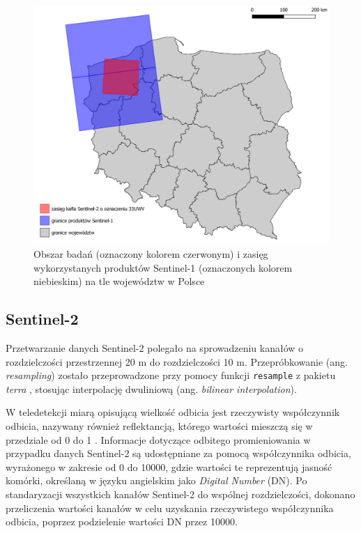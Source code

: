 \documentclass{amuthesis}
\begin{document}
\begin{figure}[t]

{\centering \includegraphics[width=1\textwidth,height=\textheight]{figures/sen1_extents.png}

}

\caption{\label{fig-rycina-s1-extents}Obszar badań (oznaczony kolorem
czerwonym) i zasięg wykorzystanych produktów Sentinel-1 (oznaczonych
kolorem niebieskim) na tle województw w Polsce}

\end{figure}

\hypertarget{sec-processing-s2}{%
\subsection{Sentinel-2}\label{sec-processing-s2}}

Przetwarzanie danych Sentinel-2 polegało na sprowadzeniu kanałów o
rozdzielczości przestrzennej 20 m do rozdzielczości 10 m.
Przepróbkowanie (ang. \emph{resampling}) zostało przeprowadzone przy
pomocy funkcji \texttt{resample} z pakietu \emph{terra}
\autocite{R-terra}, stosując interpolację dwuliniową (ang.
\emph{bilinear interpolation}).

W teledetekcji miarą opisującą wielkość odbicia jest rzeczywisty
współczynnik odbicia, nazywany również reflektancją, którego wartości
mieszczą się w przedziale od 0 do 1 \autocite{hejmanowska_2020_dane}.
Informacje dotyczące odbitego promieniowania w przypadku danych
Sentinel-2 są udostępniane za pomocą współczynnika odbicia, wyrażonego w
zakresie od 0 do 10000, gdzie wartości te reprezentują jasność komórki,
określaną w języku angielskim jako \emph{Digital Number} (DN). Po
standaryzacji wszystkich kanałów Sentinel-2 do wspólnej rozdzielczości,
dokonano przeliczenia wartości kanałów w celu uzyskania rzeczywistego
współczynnika odbicia, poprzez podzielenie wartości DN przez 10000.
\end{document}

